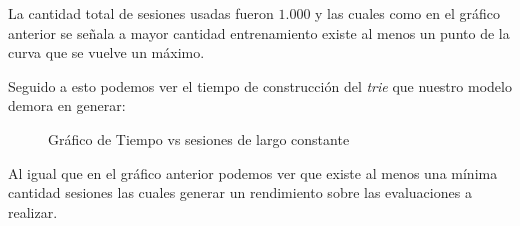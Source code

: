 	
\begin{table}[]
	\centering \label{freq:exp3}
		\caption{Frecuencia de símbolos para experimentos con sesiones de largo constante.}	
	
\end{table}	
	
	
	La cantidad total de sesiones usadas fueron $1.000$ y las cuales como en el gráfico anterior se señala a mayor cantidad entrenamiento existe al menos un punto de la curva que se vuelve un máximo.


	Seguido a esto podemos ver el tiempo de construcción del \emph{trie} que nuestro modelo demora en generar:
	
	
	
	\begin{figure}[h] 
		\centering
		\caption{Gráfico de Tiempo vs sesiones de largo constante}
		\label{fig:sim}
	\end{figure}
	
	

	Al igual que en el gráfico anterior podemos ver que existe al menos una mínima cantidad sesiones las cuales generar un rendimiento sobre las evaluaciones a realizar. 